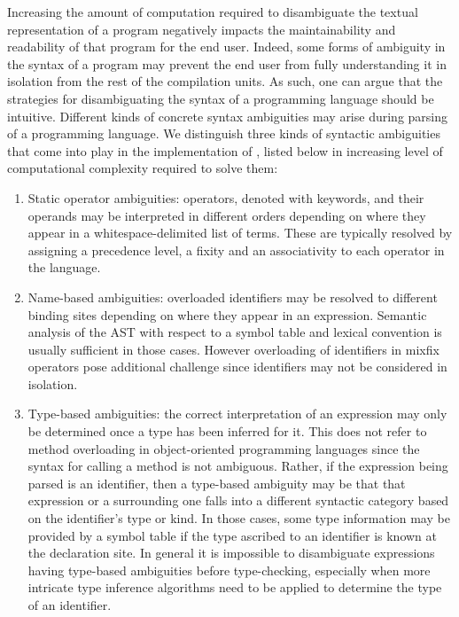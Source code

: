 Increasing the amount of computation required to disambiguate the textual representation of a program negatively impacts the maintainability and readability of that program for the end user.
Indeed, some forms of ambiguity in the syntax of a program may prevent the end user from fully understanding it in isolation from the rest of the compilation units.
As such, one can argue that the strategies for disambiguating the syntax of a programming language should be intuitive.
Different kinds of concrete syntax ambiguities may arise during parsing of a programming language.
We distinguish three kinds of syntactic ambiguities that come into play in the implementation of \Beluga, listed below in increasing level of computational complexity required to solve them:
\begin{enumerate}
\item
Static operator ambiguities: operators, denoted with keywords, and their operands may be interpreted in different orders depending on where they appear in a whitespace-delimited list of terms.
These are typically resolved by assigning a precedence level, a fixity and an associativity to each operator in the language.
\item
Name-based ambiguities: overloaded identifiers may be resolved to different binding sites depending on where they appear in an expression.
Semantic analysis of the \ac{AST} with respect to a symbol table and lexical convention is usually sufficient in those cases.
However overloading of identifiers in mixfix operators pose additional challenge since identifiers may not be considered in isolation.
\item
Type-based ambiguities: the correct interpretation of an expression may only be determined once a type has been inferred for it.
This does not refer to method overloading in object-oriented programming languages since the syntax for calling a method is not ambiguous.
Rather, if the expression being parsed is an identifier, then a type-based ambiguity may be that that expression or a surrounding one falls into a different syntactic category based on the identifier's type or kind.
In those cases, some type information may be provided by a symbol table if the type ascribed to an identifier is known at the declaration site.
In general it is impossible to disambiguate expressions having type-based ambiguities before type-checking, especially when more intricate type inference algorithms need to be applied to determine the type of an identifier.
\end{enumerate}


